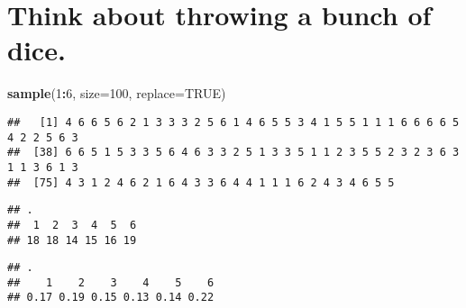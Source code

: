 \documentclass[]{book}
\newenvironment{Shaded}{\begin{snugshade}}{\end{snugshade}}
\newcommand{\DataTypeTok}[1]{\textcolor[rgb]{0.13,0.29,0.53}{#1}}
\newcommand{\DecValTok}[1]{\textcolor[rgb]{0.00,0.00,0.81}{#1}}
\newcommand{\KeywordTok}[1]{\textcolor[rgb]{0.13,0.29,0.53}{\textbf{#1}}}
\newcommand{\NormalTok}[1]{#1}
\newcommand{\OperatorTok}[1]{\textcolor[rgb]{0.81,0.36,0.00}{\textbf{#1}}}
\newcommand{\OtherTok}[1]{\textcolor[rgb]{0.56,0.35,0.01}{#1}}
\newcommand{\StringTok}[1]{\textcolor[rgb]{0.31,0.60,0.02}{#1}}
\begin{document}
\hypertarget{think-about-throwing-a-bunch-of-dice.}{%
\section{Think about throwing a bunch of dice.}\label{think-about-throwing-a-bunch-of-dice.}}

\begin{Shaded}
\begin{Highlighting}[]
\KeywordTok{sample}\NormalTok{(}\DecValTok{1}\OperatorTok{:}\DecValTok{6}\NormalTok{, }\DataTypeTok{size=}\DecValTok{100}\NormalTok{, }\DataTypeTok{replace=}\OtherTok{TRUE}\NormalTok{) }
\end{Highlighting}
\end{Shaded}

\begin{verbatim}
##   [1] 4 6 6 5 6 2 1 3 3 3 2 5 6 1 4 6 5 5 3 4 1 5 5 1 1 1 6 6 6 6 5 4 2 2 5 6 3
##  [38] 6 6 5 1 5 3 3 5 6 4 6 3 3 2 5 1 3 3 5 1 1 2 3 5 5 2 3 2 3 6 3 1 1 3 6 1 3
##  [75] 4 3 1 2 4 6 2 1 6 4 3 3 6 4 4 1 1 1 6 2 4 3 4 6 5 5
\end{verbatim}

\begin{Shaded}
\end{Shaded}

\begin{verbatim}
## .
##  1  2  3  4  5  6 
## 18 18 14 15 16 19
\end{verbatim}

\begin{Shaded}
\end{Shaded}

\begin{verbatim}
## .
##    1    2    3    4    5    6 
## 0.17 0.19 0.15 0.13 0.14 0.22
\end{verbatim}
\end{document}
